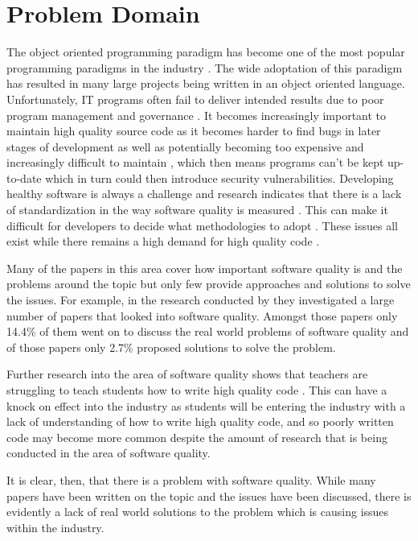\section{Problem Domain}

The object oriented programming paradigm has become one of the most popular programming paradigms in the industry \citep{6606742}. The wide adoptation of this paradigm has resulted in many large projects being written in an object oriented language.
Unfortunately, IT programs often fail to deliver intended results due to poor program management and governance \citep{7372958}. It becomes increasingly important to maintain high quality source code as it becomes harder to find bugs in later stages of development \citep{8681007} as well as potentially becoming too expensive and increasingly difficult to maintain \citep{8802820, 10.1145/2507288.2507312, 10.1145/3379597.3387457, 6606742, 7372958}, which then means programs can't be kept up-to-date which in turn could then introduce security vulnerabilities.
Developing healthy software is always a challenge \citep{8681007} and research indicates that there is a lack of standardization in the way software quality is measured \citep{6606742, 8681007}. This can make it difficult for developers to decide what methodologies to adopt \citep{6606742}. These issues all exist while there remains a high demand for high quality code \citep{6606742}.

Many of the papers in this area cover how important software quality is and the problems around the topic but only few provide approaches and solutions to solve the issues. For example, in the research conducted by \cite{6606742} they investigated a large number of papers that looked into software quality. Amongst those papers only 14.4\% of them went on to discuss the real world problems of software quality and of those papers only 2.7\% proposed solutions to solve the problem.

Further research into the area of software quality shows that teachers are struggling to teach students how to write high quality code \citep{10.1145/3428029.3428047}. This can have a knock on effect into the industry as students will be entering the industry with a lack of understanding of how to write high quality code, and so poorly written code may become more common despite the amount of research that is being conducted in the area of software quality.

It is clear, then, that there is a problem with software quality. While many papers have been written on the topic and the issues have been discussed, there is evidently a lack of real world solutions to the problem which is causing issues within the industry.
